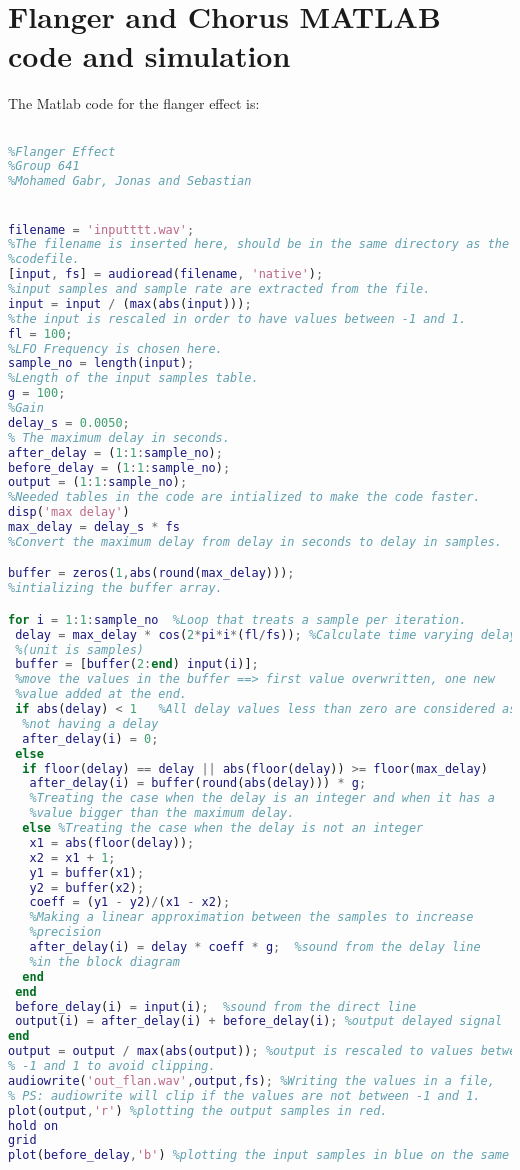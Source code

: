 \chapter{Flanger and Chorus MATLAB code and simulation}

The Matlab code for the flanger effect is:

\begin{lstlisting}[language=Matlab, caption= Matlab code for flanger effect]

%Flanger Effect
%Group 641
%Mohamed Gabr, Jonas and Sebastian


filename = 'inputttt.wav'; 
%The filename is inserted here, should be in the same directory as the
%codefile.
[input, fs] = audioread(filename, 'native');
%input samples and sample rate are extracted from the file.
input = input / (max(abs(input)));
%the input is rescaled in order to have values between -1 and 1. 
fl = 100;  
%LFO Frequency is chosen here.
sample_no = length(input); 
%Length of the input samples table.
g = 100; 
%Gain
delay_s = 0.0050; 
% The maximum delay in seconds.
after_delay = (1:1:sample_no); 
before_delay = (1:1:sample_no);
output = (1:1:sample_no);
%Needed tables in the code are intialized to make the code faster.
disp('max delay')
max_delay = delay_s * fs  
%Convert the maximum delay from delay in seconds to delay in samples.

buffer = zeros(1,abs(round(max_delay))); 
%intializing the buffer array.

for i = 1:1:sample_no  %Loop that treats a sample per iteration. 
 delay = max_delay * cos(2*pi*i*(fl/fs)); %Calculate time varying delay 
 %(unit is samples)
 buffer = [buffer(2:end) input(i)]; 
 %move the values in the buffer ==> first value overwritten, one new 
 %value added at the end.
 if abs(delay) < 1   %All delay values less than zero are considered as
  %not having a delay
  after_delay(i) = 0;
 else
  if floor(delay) == delay || abs(floor(delay)) >= floor(max_delay)
   after_delay(i) = buffer(round(abs(delay))) * g;
   %Treating the case when the delay is an integer and when it has a
   %value bigger than the maximum delay. 
  else %Treating the case when the delay is not an integer
   x1 = abs(floor(delay));
   x2 = x1 + 1;
   y1 = buffer(x1);
   y2 = buffer(x2);
   coeff = (y1 - y2)/(x1 - x2);
   %Making a linear approximation between the samples to increase
   %precision
   after_delay(i) = delay * coeff * g;  %sound from the delay line
   %in the block diagram 
  end
 end
 before_delay(i) = input(i);  %sound from the direct line
 output(i) = after_delay(i) + before_delay(i); %output delayed signal 
end
output = output / max(abs(output)); %output is rescaled to values between
% -1 and 1 to avoid clipping. 
audiowrite('out_flan.wav',output,fs); %Writing the values in a file, 
% PS: audiowrite will clip if the values are not between -1 and 1. 
plot(output,'r') %plotting the output samples in red.
hold on
grid
plot(before_delay,'b') %plotting the input samples in blue on the same fig.




\end{lstlisting}


